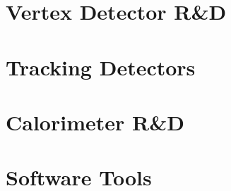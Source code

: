 \documentclass[10pt,final]{report}
\begin{document}
\tableofcontents
\chapter{Vertex Detector R\&D}






\newpage

\newpage
% 
\chapter{Tracking Detectors}



\chapter{Calorimeter R\&D}











\chapter{Software Tools}



\printbibliography
\end{document}
